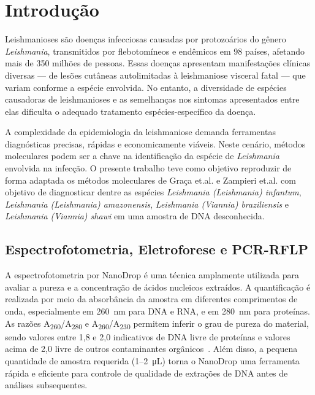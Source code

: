 \section{Introdução}

Leishmanioses são doenças infecciosas causadas por protozoários do gênero
\textit{Leishmania}, transmitidos por flebotomíneos e endêmicos em 98 países,
afetando mais de 350 milhões de pessoas\cite{hong2020one}. Essas doenças
apresentam manifestações clínicas diversas — de lesões cutâneas autolimitadas à
leishmaniose visceral fatal — que variam conforme a espécie envolvida. No
entanto, a diversidade de espécies causadoras de leishmanioses e as semelhanças
nos sintomas apresentados entre elas dificulta o adequado tratamento
espécies-específico da doença.

A complexidade da epidemiologia da leishmaniose demanda ferramentas diagnósticas
precisas, rápidas e economicamente viáveis.  Neste cenário, métodos moleculares
podem ser a chave na identificação da espécie de \textit{Leishmania} envolvida
na infecção. O presente trabalho teve como objetivo reproduzir de forma adaptada
os métodos moleculares de Graça
et.al.\cite{RFLPgraca2012} e Zampieri et.al.\cite{HRMzampi2016} com objetivo de
diagnosticar dentre as espécies \textit{Leishmania (Leishmania) infantum},
\textit{Leishmania (Leishmania) amazonensis}, \textit{Leishmania (Viannia)
braziliensis} e \textit{Leishmania (Viannia)
shawi} em uma amostra de DNA desconhecida. 

\subsection{Espectrofotometria, Eletroforese e PCR-RFLP}

A espectrofotometria por NanoDrop é uma técnica amplamente utilizada para avaliar a pureza e a 
concentração de ácidos nucleicos extraídos. A quantificação é realizada por meio da absorbância da 
amostra em diferentes comprimentos de onda, especialmente em \SI{260}{\nano\meter} para DNA e RNA, 
e em \SI{280}{\nano\meter} para proteínas. As razões A\textsubscript{260}/A\textsubscript{280} e A\textsubscript{260}/A\textsubscript{230} permitem 
inferir o grau de pureza do material, sendo valores entre 1{,}8 e 2{,}0 indicativos de DNA livre de proteínas 
e valores acima de 2{,}0 livre de outros contaminantes orgânicos~\cite{nanodrop}. Além disso, a pequena quantidade de amostra requerida (1–2~\si{\micro\liter}) 
torna o NanoDrop uma ferramenta rápida e eficiente para controle de qualidade de extrações de DNA antes de análises subsequentes.

